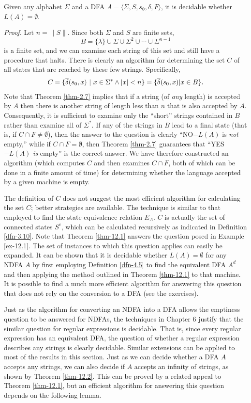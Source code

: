 \begin{thm}\label{thm-12.1}
Given any alphabet $\Sigma$ and a DFA $A=\langle\Sigma,S,s_0,\delta,F\rangle$,
it is decidable whether $L(A)=\emptyset$.

\emph{Proof.} Let $n=\|S\|$. Since both $\Sigma$ and $S$ are finite sets,
\[ B = \{\lambda\}\cup\Sigma\cup\Sigma^2\cup\cdots\cup\Sigma^{n-1} \]
is a finite set, and we can examine each string of this set and still have a
procedure that halts. There is clearly an algorithm for determining the set $C$
of all states that are reached by these few strings. Specifically,
\[ C=\{\overline{\delta}(s_0,x)\ |\ x\in\Sigma^*\wedge |x|<n\}=\{\overline{\delta}(s_0,x)|x\in B\}. \]
Note that Theorem \ref{thm-2.7} implies that if a string (of \emph{any} length) is
accepted by $A$ then there is another string of length less than $n$ that is
also accepted by $A$. Consequently, it is sufficient to examine only the
``short'' strings contained in $B$ rather than examine all of $\Sigma^*$. If any
of the strings in $B$ lead to a final state (that is, if $C\cap F\not=\emptyset$),
then the answer to the question is clearly ``NO$-L(A)$ is \emph{not} empty,''
while if $C\cap F=\emptyset$, then Theorem \ref{thm-2.7} guarantees that ``YES$-L(A)$
\emph{is} empty'' is the correct answer. We have therefore constructed an
algorithm (which computes $C$ and then examines $C\cap F$, both of which can be
done in a finite amount of time) for determining whether the language accepted
by a given machine is empty.
\end{thm}

The definition of $C$ does not suggest the most efficient algorithm for
calculating the set $C$; better strategies are available. The technique is
similar to that employed to find the state equivalence relation $E_A$. $C$ is
actually the set of connected states $S^c$, which can be calculated recursively
as indicated in Definition \ref{dfn-3.10}. Note that Theorem \ref{thm-12.1} answers the question
posed in Example \ref{ex-12.1}. The set of instances to which this question applies can
easily be expanded. It can be shown that it is decidable whether $L(A)=\emptyset$
for any NDFA $A$ by first employing Definition \ref{dfn-4.5} to find the equivalent DFA
$A^d$ and then applying the method outlined in Theorem \ref{thm-12.1} to that machine. It
is possible to find a much more efficient algorithm for answering this question
that does not rely on the conversion to a DFA (see the exercises).

Just as the algorithm for converting an NDFA into a DFA allows the emptiness
question to be answered for NDFAs, the techniques in Chapter 6 justify that
the similar question for regular expressions is decidable. That is, since
every regular expression has an equivalent DFA, the question of whether a
regular expression describes any strings is clearly decidable. Similar
extensions can be applied to most of the results in this section. Just as we can
decide whether a DFA $A$ accepts any strings, we can also decide if $A$ accepts
an infinity of strings, as shown by Theorem \ref{thm-12.2}. This can be proved by a
related appeal to Theorem \ref{thm-12.1}, but an efficient algorithm for answering this
question depends on the following lemma.


